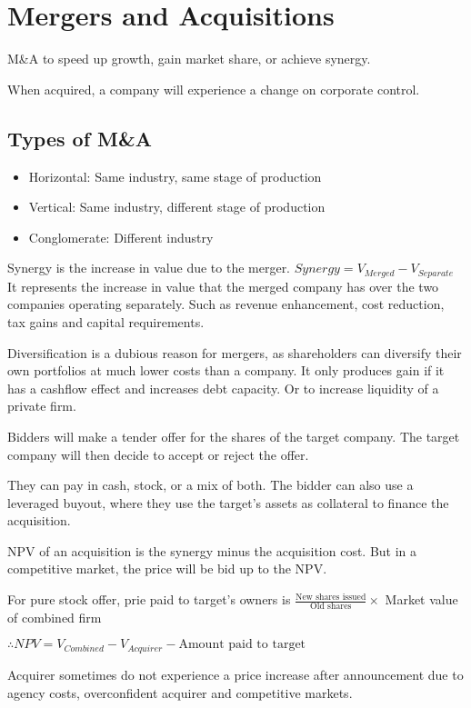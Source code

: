 \section{Mergers and Acquisitions}
M\&A to speed up growth, gain market share, or achieve synergy.

When acquired, a company will experience a change on corporate control.

\subsection{Types of M\&A}
\begin{itemize}
    \item Horizontal: Same industry, same stage of production
    \item Vertical: Same industry, different stage of production
    \item Conglomerate: Different industry
\end{itemize}

Synergy is the increase in value due to the merger.
$Synergy = V_{Merged} - V_{Separate}$
It represents the increase in value that the merged company has over the two companies operating separately. Such as revenue enhancement, cost reduction, tax gains and capital requirements.

Diversification is a dubious reason for mergers, as shareholders can diversify their own portfolios at much lower costs than a company.
It only produces gain if it has a cashflow effect and increases debt capacity. Or to increase liquidity of a private firm.

Bidders will make a tender offer for the shares of the target company. The target company will then decide to accept or reject the offer.

They can pay in cash, stock, or a mix of both. The bidder can also use a leveraged buyout, where they use the target's assets as collateral to finance the acquisition.

NPV of an acquisition is the synergy minus the acquisition cost. But in a competitive market, the price will be bid up to the NPV. 

For pure stock offer, prie paid to target's owners is $\frac{\text{New shares issued}}{\text{Old shares}} \times$ Market value of combined firm

$\therefore NPV = V_{Combined} - V_{Acquirer} - \text{Amount paid to target}$

Acquirer sometimes do not experience a price increase after announcement due to agency costs, overconfident acquirer and competitive markets.

